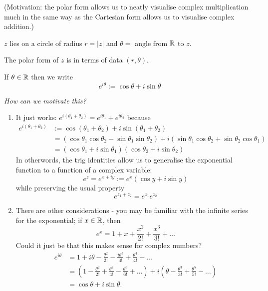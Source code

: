 \documentclass[twoside]{scrartcl}
\begin{document}


(Motivation: the polar form allows us to neatly visualise complex multiplication much in the same way as the Cartesian form allows us to visualise complex addition.) 

\begin{center}
\end{center}

$z$ lies on a circle of radius $r = |z|$ and $\theta = $ angle from $\mathbb{R}$ to $z$. 

The polar form of $z$ is in terms of data $(r,\theta)$. \\

\begin{definition}
 If $\theta \in\mathbb{R}$ then we write 
 \[e^{i\theta} := \cos \theta + i\sin\theta\]
\end{definition}

\emph{How can we motivate this? }

\begin{enumerate}
\item It just works: $e^{i(\theta_1 + \theta_2)} = e^{i\theta_1} + e^{i\theta_2}$ because
\[
\begin{aligned}
  e^{i(\theta_1 + \theta_2)} &:= \cos(\theta_1 + \theta_2) + i\sin(\theta_1 + \theta_2)\\
  &= (\cos\theta_1\cos\theta_2 - \sin\theta_1\sin\theta_2) + i(\sin\theta_1\cos\theta_2 + \sin\theta_2\cos\theta_1)\\
  &= (\cos\theta_1 + i\sin\theta_1)(\cos\theta_2 + i\sin\theta_2)
\end{aligned}
\]
In otherwords, the trig identities allow us to generalise the exponential function to a function of a complex variable: 
\[e^z = e^{x + iy} := e^x (\cos y + i\sin y)\]
while preserving the usual property 
\[e^{z_1 + z_2} = e^{z_1} e^{z_2}\]

\item There are other considerations - you may be familiar with the infinite series for the exponential; if $x \in\mathbb{R}$, then 
\[e^x = 1 + x + \frac{x^2}{2!} + \frac{x^3}{3!} + \dots \]
Could it just be that this makes sense for complex numbers?
\[
\begin{aligned}
 e^{i\theta} &= 1 + i\theta - \frac{\theta^2}{2!} - \frac{i\theta^3}{3!} + \frac{\theta^4}{4!} + \dots\\
 &= \left( 1 - \frac{\theta^2}{2!} + \frac{\theta^4}{4!} - \frac{\theta^6}{6!} + \dots\right) + i\left( \theta - \frac{\theta^3}{3!} + \frac{\theta^5}{5!} - \dots\right)\\
 &= \cos\theta + i\sin\theta.
\end{aligned}
\]
\end{enumerate}
\end{document}
